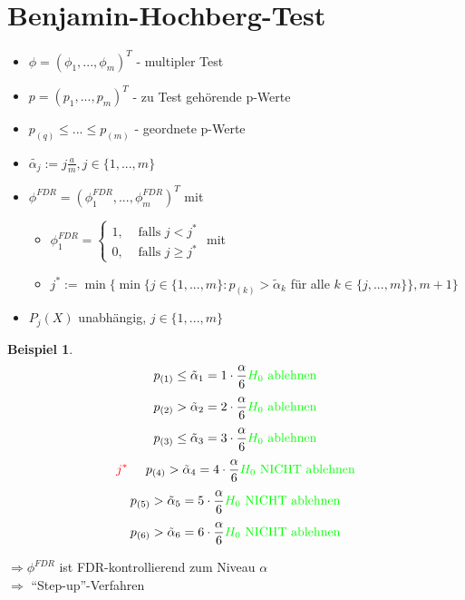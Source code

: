 \documentclass[10pt]{report}
\theoremstyle{definition}
\newtheorem{exmp}{Beispiel}
\begin{document}
\section{Benjamin-Hochberg-Test}
\begin{itemize}
 \item $\phi=(\phi_1,...,\phi_m)^{T}$ - multipler Test 
 \item $p=(p_1,...,p_m)^{T}$ - zu Test gehörende p-Werte 
 \item $p_{(q)} \leq ... \leq p_{(m)}$ - geordnete p-Werte 
 \item $\tilde{\alpha_{j}} := j \frac{a}{m} , j \in \{1,...,m\}$ 
 \item $\phi^{FDR} = \left(\phi_{1}^{FDR},...,\phi_{m}^{FDR}\right)^{T}$ mit 
 \begin{itemize}
  \item $\phi_{1}^{FDR} = \begin{cases}
                           1, &  \text{ falls } j < j^* \\
                           0, &  \text{ falls } j \geq j^*
                          \end{cases}$ mit
 \item $j^{*}:=\min \{ \min \{j \in \{1,...,m \}: p_{(k)} > \tilde{\alpha}_{k}$ für alle $k \in \{j,...,m\} \}, m+1 \}$
 \end{itemize}
\item $P_j(X)$ unabhängig, $j \in \{1,...,m\}$
\end{itemize}

\begin{exmp}
\[ p_{(1)} \leq \tilde{\alpha}_1  = 1 \cdot \frac{\alpha}{6} \textcolor{green}{H_0 \text{ ablehnen}} \]
\[ p_{(2)} > \tilde{\alpha}_2  = 2 \cdot \frac{\alpha}{6} \textcolor{green}{H_0 \text{ ablehnen}}\]
\[ p_{(3)} \leq \tilde{\alpha}_3  = 3 \cdot \frac{\alpha}{6} \textcolor{green}{H_0 \text{ ablehnen}}\]
\[\textcolor{red}{j^*}\hspace{0.5cm} p_{(4)} > \tilde{\alpha}_4  = 4 \cdot \frac{\alpha}{6} \textcolor{green}{H_0 \text{ NICHT ablehnen}}\]
\[ p_{(5)} > \tilde{\alpha}_5  = 5 \cdot \frac{\alpha}{6} \textcolor{green}{H_0 \text{ NICHT ablehnen}}\]
\[ p_{(6)} > \tilde{\alpha}_6  = 6 \cdot \frac{\alpha}{6} \textcolor{green}{H_0 \text{ NICHT ablehnen}}\]
\end{exmp}

$\Rightarrow \phi^{FDR}$ ist FDR-kontrollierend zum Niveau $\alpha$  \\
$\Rightarrow$ ``Step-up''-Verfahren
\end{document}

